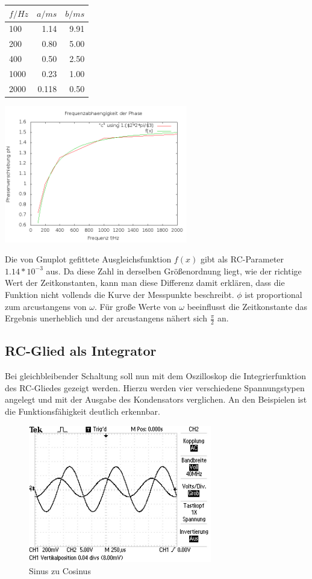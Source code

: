 \begin{minipage}[hbt]{5cm}
	\centering
	\begin{tabular}[c]{l|r|r}
$f/Hz$ & $a/ms$	& $b/ms$\\
\hline
100 &	1.14 &	9.91\\
200 &	0.80 &	5.00\\
400 &	0.50 &	2.50\\
1000 &	0.23 &	1.00\\
2000 &	0.118 &	0.50
\end{tabular}
\end{minipage}
\hfill
\begin{minipage}[hbt]{8cm}
	\centering
	\includegraphics[width=8cm]{_pics/RC3.png}
\end{minipage}


Die von Gnuplot gefittete Ausgleichsfunktion $f(x)$ gibt als RC-Parameter $1.14*10^{-3}$ aus. Da diese Zahl in derselben
Größenordnung liegt, wie der richtige Wert der Zeitkonstanten, kann man diese Differenz damit erklären, dass die Funktion
nicht vollends die Kurve der Messpunkte beschreibt. $\phi$ ist proportional zum arcustangens von $\omega$. Für große Werte
von $\omega$ beeinflusst die Zeitkonstante das Ergebnis unerheblich und der arcustangens nähert sich $\frac{\pi}{2}$ an.

\subsection{RC-Glied als Integrator}
Bei gleichbleibender Schaltung soll nun mit dem Oszilloskop die Integrierfunktion des RC-Gliedes gezeigt werden. 
Hierzu werden vier verschiedene Spannungstypen angelegt und mit der Ausgabe des Kondensators verglichen. An den
Beispielen ist die Funktionsfähigkeit deutlich erkennbar.

\begin{figure}[htbp]
\includegraphics[width=8cm] {_pics/sinus.JPG}
\centering
\caption* {Sinus zu Cosinus}
\end{figure}

